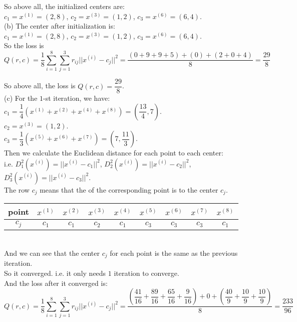 \documentclass[10pt]{article}
\begin{document}
\begin{enumerate}[1.]
So above all, the initialized centers are:\\
$c_1=x^{(1)}=(2,8)$, $c_2=x^{(3)}=(1,2)$, $c_3=x^{(6)}=(6,4)$.\\
 
(b) The center after initialization is:\\
$c_1=x^{(1)}=(2,8)$, $c_2=x^{(3)}=(1,2)$, $c_3=x^{(6)}=(6,4)$.\\

So the loss is
$$Q(r,c)=\dfrac{1}{8}\sum\limits_{i=1}^8\sum\limits_{j=1}^3r_{ij}||x^{(i)}-c_j||^2=\dfrac{(0+9+9+5)+(0)+(2+0+4)}{8}=\dfrac{29}{8}$$

So above all, the loss is $Q(r,c)=\dfrac{29}{8}$.\\

(c) For the $1$-st iteration, we have:\\
$c_1 = \dfrac{1}{4}(x^{(1)}+x^{(2)}+x^{(4)}+x^{(8)})=(\dfrac{13}{4},7)$.\\
$c_2 = x^{(3)}=(1,2)$.\\
$c_3 = \dfrac{1}{3}(x^{(5)}+x^{(6)}+x^{(7)})=(7,\dfrac{11}{3})$.\\

Then we calculate the Euclidean distance for each point to each center:\\
i.e. $D_1^2(x^{(i)})=||x^{(i)}-c_1||^2$, $D_2^2(x^{(i)})=||x^{(i)}-c_2||^2$, $D_3^2(x^{(i)})=||x^{(i)}-c_3||^2$.\\
The row $c_j$ means that the of the corresponding point is to the center $c_j$.\\ 
\begin{tabular}{|c|c|c|c|c|c|c|c|c|}
	\hline
	point & $x^{(1)}$ & $x^{(2)}$ & $x^{(3)}$ & $x^{(4)}$ & $x^{(5)}$ & $x^{(6)}$ & $x^{(7)}$ & $x^{(8)}$\\
	\hline
	\text{center} $c_j$ & $c_1$ & $c_1$ & $c_2$ & $c_1$ & $c_3$ & $c_3$ & $c_3$ & $c_1$\\
	\hline
\end{tabular}\\

And we can see that the center $c_j$ for each point is the same as the previous iteration.\\
So it converged. i.e. it only needs $1$ iteration to converge.\\

And the loss after it converged is:
$$Q(r,c)=\dfrac{1}{8}\sum\limits_{i=1}^8\sum\limits_{j=1}^3r_{ij}||x^{(i)}-c_j||^2=\dfrac{(\dfrac{41}{16}+\dfrac{89}{16}+\dfrac{65}{16}+\dfrac{9}{16})+0+(\dfrac{40}{9}+\dfrac{10}{9}+\dfrac{10}{9})}{8}=\dfrac{233}{96}$$
		 

\end{enumerate}
\end{document}
